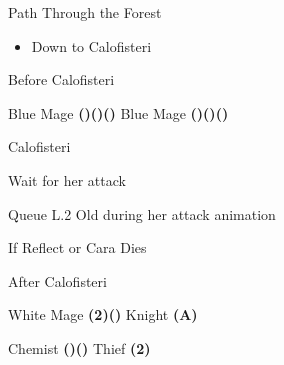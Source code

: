 \begin{paracol}{2}
\begin{misc}{Path Through the Forest}
    \begin{itemize}
        \item Down to Calofisteri
    \end{itemize}
\end{misc}

\begin{menu}{Before Calofisteri}
    \varwb
    \begin{jobMenu}
        \faris Blue Mage \textbf{(\pointDown)(\pointLeft)(\pointDown)} \equip{\runningShoes}
        \cara Blue Mage \textbf{(\pointDown)(\pointLeft)(\pointDown)}
    \end{jobMenu}
    \varwe
\end{menu}

\begin{boss}{Calofisteri}
    \varwb
    \begin{round}{1}
        \item Wait for her attack
        \item Queue L.2 Old during her attack animation
    \end{round}
    \begin{round}{2}
        \faris \leftCommand{\blue} \then \ltwoOld
        \item {}
        \item {}
        \cara \leftCommand{\blue} \then \lfiveDeath
    \end{round}
    \begin{bossPart}{If Reflect or Cara Dies}
        \lenna \leftCommand{\dimenAbility} \then \reset
    \end{bossPart}
    \varwe
\end{boss}

\begin{menu}{After Calofisteri}
    \varwb
    \begin{jobMenu}
        \cara White Mage \textbf{(2\pointRight)(\pointDown)}
        \lenna Knight \textbf{(A)} \ability{!\dimenAbility} \optimize
    \end{jobMenu}
    \begin{magicMenu}
        \lenna \float \space \then {}
        \cara \size \space \then {}
        \cara \life \space \then {}
    \end{magicMenu}
    \begin{equipMenu}
        \faris {}
        \bartz \optimize
    \end{equipMenu}
    \begin{jobMenu}
        \faris Chemist \textbf{(\pointUp)(\pointRight)} \ability{!\gilToss}
        \cara Thief \textbf{(2\pointRight)}
    \end{jobMenu}
    \varwe
\end{menu}


\end{paracol}
